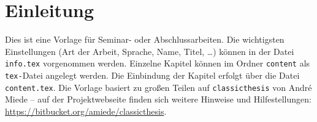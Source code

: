 \chapter{Einleitung}\label{ch:einleitung}
Dies ist eine Vorlage für Seminar- oder Abschlussarbeiten. Die wichtigsten Einstellungen (Art der Arbeit, Sprache, Name, Titel, \dots) können in der Datei \texttt{info.tex} vorgenommen werden. Einzelne Kapitel können im Ordner \texttt{content} als \texttt{tex-}Datei angelegt werden. Die Einbindung der Kapitel erfolgt über die Datei \texttt{content.tex}. Die Vorlage basiert zu großen Teilen auf \texttt{classicthesis} von André Miede -- auf der Projektwebseite finden sich weitere Hinweise und Hilfestellungen: \url{https://bitbucket.org/amiede/classicthesis}.





